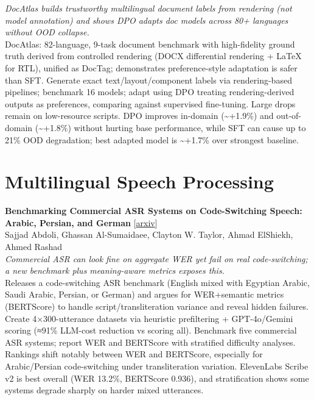 \documentclass[12pt,letterpaper]{article}
\begin{document}
{\small\textit{DocAtlas builds trustworthy multilingual document labels from rendering (not model annotation) and shows DPO adapts doc models across 80+ languages without OOD collapse.}}\\[1pt]
{\footnotesize DocAtlas: 82-language, 9-task document benchmark with high-fidelity ground truth derived from controlled rendering (DOCX differential rendering + LaTeX for RTL), unified as DocTag; demonstrates preference-style adaptation is safer than SFT. Generate exact text/layout/component labels via rendering-based pipelines; benchmark 16 models; adapt using DPO treating rendering-derived outputs as preferences, comparing against supervised fine-tuning. Large drops remain on low-resource scripts. DPO improves in-domain (\textasciitilde{}+1.9\%) and out-of-domain (\textasciitilde{}+1.8\%) without hurting base performance, while SFT can cause up to 21\% OOD degradation; best adapted model is \textasciitilde{}+1.7\% over strongest baseline.}

\medskip


\section*{Multilingual Speech Processing}

{\small\textbf{Benchmarking Commercial ASR Systems on Code-Switching Speech: Arabic, Persian, and German}} {\scriptsize[\href{https://arxiv.org/abs/2605.19069}{arxiv}]}\\
{\scriptsize Sajjad Abdoli, Ghassan Al-Sumaidaee, Clayton W. Taylor, Ahmad ElShiekh, Ahmed Rashad}\\

{\small\textit{Commercial ASR can look fine on aggregate WER yet fail on real code-switching; a new benchmark plus meaning-aware metrics exposes this.}}\\[1pt]
{\footnotesize Releases a code-switching ASR benchmark (English mixed with Egyptian Arabic, Saudi Arabic, Persian, or German) and argues for WER+semantic metrics (BERTScore) to handle script/transliteration variance and reveal hidden failures. Create 4×300-utterance datasets via heuristic prefiltering + GPT-4o/Gemini scoring (≈91\% LLM-cost reduction vs scoring all). Benchmark five commercial ASR systems; report WER and BERTScore with stratified difficulty analyses. Rankings shift notably between WER and BERTScore, especially for Arabic/Persian code-switching under transliteration variation. ElevenLabs Scribe v2 is best overall (WER 13.2\%, BERTScore 0.936), and stratification shows some systems degrade sharply on harder mixed utterances.}
\end{document}
